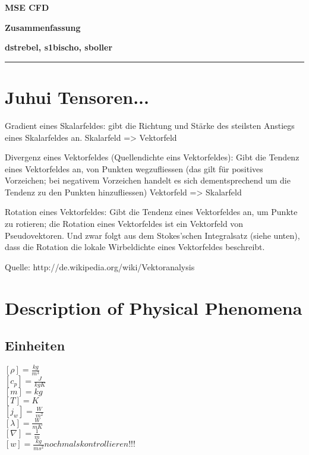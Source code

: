 \documentclass[a4paper]{scrartcl}
\begin{document}
\pagestyle{fancy}
\setlength{\footskip}{10mm}
\fancyhf{}
\renewcommand{\headrulewidth}{0pt}
\renewcommand{\footrulewidth}{0.5pt}

 \centerline{\LARGE \bf \textsf{MSE CFD}} 
 \smallskip
\centerline{\Large \bf \textsf {Zusammenfassung}}
\medskip
  \centerline{\bf \textsf{dstrebel, s1bischo, sboller }}

 \smallskip \noindent\rule{\textwidth}{0.5pt}
\smallskip%



\section{Juhui Tensoren...}

Gradient eines Skalarfeldes: gibt die Richtung und Stärke des steilsten Anstiegs
eines Skalarfeldes an.
Skalarfeld => Vektorfeld

Divergenz eines Vektorfeldes (Quellendichte eins Vektorfeldes): Gibt die Tendenz
eines Vektorfeldes an, von Punkten wegzufliessen (das gilt für positives
Vorzeichen; bei negativem Vorzeichen handelt es sich dementsprechend um die
Tendenz zu den Punkten hinzufliessen) Vektorfeld => Skalarfeld

Rotation eines Vektorfeldes: Gibt die Tendenz eines Vektorfeldes an, um Punkte
zu rotieren; die Rotation eines Vektorfeldes ist ein Vektorfeld von
Pseudovektoren. Und zwar folgt aus dem Stokes’schen Integralsatz (siehe unten),
dass die Rotation die lokale Wirbeldichte eines Vektorfeldes beschreibt.

Quelle: http://de.wikipedia.org/wiki/Vektoranalysis



\section{Description of Physical Phenomena}
\subsection{Einheiten}

$ [\rho]=\frac{kg}{m^3} $\\
$ [c_p]=\frac{J}{kgK} $\\
$ [m]=kg $\\
$ [T]=K $\\
$ [j_w]=\frac{W}{m^2} $\\
$ [\lambda]=\frac{W}{mK} $\\
$ [\nabla]=\frac{1}{m} $\\
$ [w]=\frac{kg}{ms^2} nochmals kontrollieren!!! $\\
\end{document}
